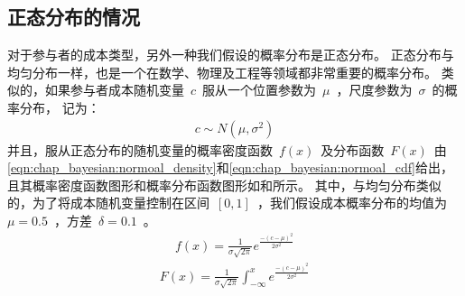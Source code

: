 \subsection{正态分布的情况}
对于参与者的成本类型，另外一种我们假设的概率分布是正态分布。
正态分布与均匀分布一样，也是一个在数学、物理及工程等领域都非常重要的概率分布。
类似的，如果参与者成本随机变量~$c$~服从一个位置参数为~$\mu$~，尺度参数为~$\sigma$~的概率分布，
记为：
\begin{align*}
    c \sim N(\mu, \sigma^2)
\end{align*}
并且，服从正态分布的随机变量的概率密度函数~$f(x)$~及分布函数~$F(x)$~由\eqref{eqn:chap_bayesian:normoal_density}和\eqref{eqn:chap_bayesian:normoal_cdf}给出，
且其概率密度函数图形和概率分布函数图形如和所示。
其中，与均匀分布类似的，为了将成本随机变量控制在区间~$[0,1]$~，我们假设成本概率分布的均值为~$\mu = 0.5$~，方差~$\delta = 0.1$~。
\begin{align}
    f(x) = \frac{1}{\sigma \sqrt{2\pi} } e^{ \frac{-(c-\mu)^2}{2\sigma^2}}
    \label{eqn:chap_bayesian:normoal_density}
\end{align}
\begin{align}
    F(x) = \frac{1}{\sigma \sqrt{2\pi} } \int^x_{-\infty}e^{ \frac{-(c-\mu)^2}{2\sigma^2}}
    \label{eqn:chap_bayesian:normoal_cdf}
\end{align}
